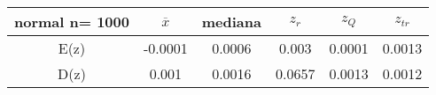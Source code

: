 \begin{tabular}{|c|c|c|c|c|c|}
\hline
normal n= 1000& $\overline{x}$ & mediana & $z_r$ & $z_Q$ & $z_{tr}$ \\ \hline
E(z) & -0.0001 & 0.0006 & 0.003 & 0.0001 & 0.0013 \\ \hline
D(z) & 0.001 & 0.0016 & 0.0657 & 0.0013 & 0.0012 \\ \hline
\end{tabular}